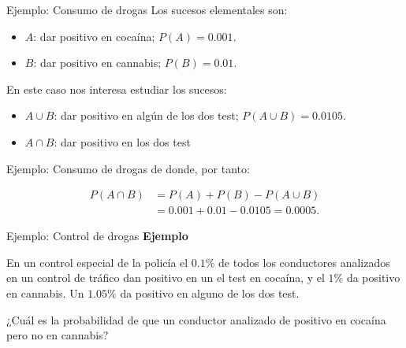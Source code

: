 \documentclass[
  ignorenonframetext,
  aspectratio=169]{beamer}
\providecommand{\tightlist}{%
  \setlength{\itemsep}{0pt}\setlength{\parskip}{0pt}}\usepackage{longtable,booktabs,array}
\begin{document}
\begin{frame}{Ejemplo: Consumo de drogas}
\label{ejemplo-consumo-de-drogas-2}
Los sucesos elementales son:

\begin{itemize}
\tightlist
\item
  \(A\): dar positivo en cocaína; \(P(A)=0.001.\)
\item
  \(B\): dar positivo en cannabis; \(P(B)=0.01.\)
\end{itemize}

En este caso nos interesa estudiar los sucesos:

\begin{itemize}
\tightlist
\item
  \(A\cup B\): dar positivo en algún de los dos test;
  \(P(A\cup B)=0.0105.\)
\item
  \(A\cap B\): dar positivo en los dos test
\end{itemize}
\end{frame}

\begin{frame}{Ejemplo: Consumo de drogas}
\label{ejemplo-consumo-de-drogas-3}
de donde, por tanto:

\[\begin{array}{rl}
{P(A\cap B)} &{=P(A)+P(B)-P(A\cup B)}\\ &{=0.001+0.01-0.0105=0.0005}.
\end{array}\]
\end{frame}

\begin{frame}{Ejemplo: Control de drogas}
\label{ejemplo-control-de-drogas}
\textbf{Ejemplo}

En un control especial de la policía el \(0.1\%\) de todos los
conductores analizados en un control de tráfico dan positivo en un el
test en cocaína, y el \(1\%\) da positivo en cannabis. Un \(1.05\%\) da
positivo en alguno de los dos test.

¿Cuál es la probabilidad de que un conductor analizado de positivo en
cocaína pero no en cannabis?
\end{frame}
\end{document}
